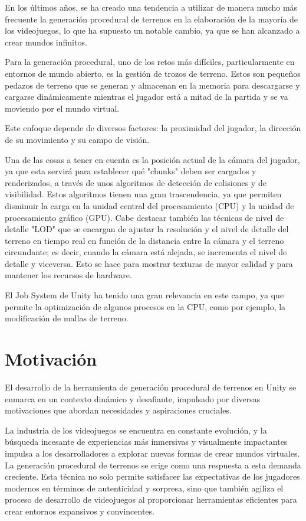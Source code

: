 En los últimos años, se ha creado una tendencia a utilizar de manera mucho más frecuente la generación procedural de terrenos en la elaboración de la mayoría de los videojuegos, lo que ha supuesto un notable cambio, ya que se han alcanzado a crear mundos infinitos.

Para la generación procedural, uno de los retos más difíciles, particularmente en entornos de mundo abierto, es la gestión de trozos de terreno. Estos son pequeños pedazos de terreno que se generan y almacenan en la memoria para descargarse y cargarse dinámicamente mientras el jugador está a mitad de la partida y se va moviendo por el mundo virtual.

Este enfoque depende de diversos factores: la proximidad del jugador, la dirección de su movimiento y su campo de visión.

Una de las cosas a tener en cuenta es la posición actual de la cámara del jugador, ya que esta servirá para establecer qué "chunks" deben ser cargados y renderizados, a través de unos algoritmos de detección de colisiones y de visibilidad. Estos algoritmos tienen una gran trascendencia, ya que permiten disminuir la carga en la unidad central del procesamiento (CPU) y la unidad de procesamiento gráfico (GPU). Cabe destacar también las técnicas de nivel de detalle "LOD" que se encargan de ajustar la resolución y el nivel de detalle del terreno en tiempo real en función de la distancia entre la cámara y el terreno circundante; es decir, cuando la cámara está alejada, se incrementa el nivel de detalle y viceversa. Esto se hace para mostrar texturas de mayor calidad y para mantener los recursos de hardware.

El Job System de Unity ha tenido una gran relevancia en este campo, ya que permite la optimización de algunos procesos en la CPU, como por ejemplo, la modificación de mallas de terreno.

\section{Motivación}

El desarrollo de la herramienta de generación procedural de terrenos en Unity se enmarca en un contexto dinámico y desafiante, impulsado por diversas motivaciones que abordan necesidades y aspiraciones cruciales.

La industria de los videojuegos se encuentra en constante evolución, y la búsqueda incesante de experiencias más inmersivas y visualmente impactantes impulsa a los desarrolladores a explorar nuevas formas de crear mundos virtuales. La generación procedural de terrenos se erige como una respuesta a esta demanda creciente. Esta técnica no solo permite satisfacer las expectativas de los jugadores modernos en términos de autenticidad y sorpresa, sino que también agiliza el proceso de desarrollo de videojuegos al proporcionar herramientas eficientes para crear entornos expansivos y convincentes.

